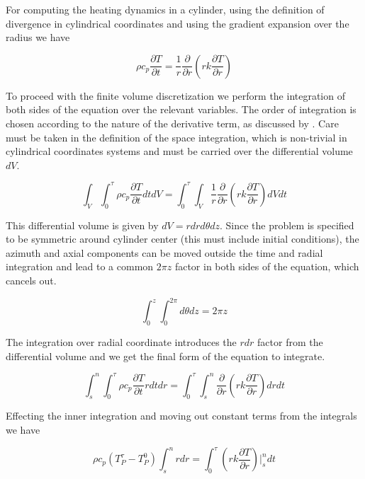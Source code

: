 \documentclass[oneside]{textbook}
\begin{document}
For computing the heating dynamics in a cylinder, using the definition of divergence in cylindrical coordinates and using the gradient expansion over the radius we have

\begin{equation}
\rho{}c_{p}\frac{\partial{}T}{\partial{}t}=
\frac{1}{r}\frac{\partial}{\partial{}r}
\left(rk\frac{\partial{}T}{\partial{}r}\right)
\end{equation}

To proceed with the finite volume discretization we perform the integration of both sides of the equation over the relevant variables. The order of integration is chosen according to the nature of the derivative term, as discussed by \textcite{Patankar1980}. Care must be taken in the definition of the space integration, which is non-trivial in cylindrical coordinates systems and must be carried over the differential volume $dV$.

\begin{equation}
\int_{V}\int_{0}^{\tau}
\rho{}c_{p}\frac{\partial{}T}{\partial{}t}dtdV=
\int_{0}^{\tau}\int_{V}
\frac{1}{r}\frac{\partial}{\partial{}r}
\left(rk\frac{\partial{}T}{\partial{}r}\right)dVdt
\end{equation}

This differential volume is given by $dV=rdr{}d\theta{}dz$. Since the problem is specified to be symmetric around cylinder center (this must include initial conditions), the azimuth and axial components can be moved outside the time and radial integration and lead to a common $2\pi{}z$ factor in both sides of the equation, which cancels out.

\begin{equation}
\int_{0}^{z}\int_{0}^{2\pi}d\theta{}dz=2\pi{}z
\end{equation}

The integration over radial coordinate introduces the $rdr$ factor from the differential volume and we get the final form of the equation to integrate.

\begin{equation}
\int_{s}^{n}\int_{0}^{\tau}
\rho{}c_{p}\frac{\partial{}T}{\partial{}t}rdtdr=
\int_{0}^{\tau}\int_{s}^{n}
\frac{\partial}{\partial{}r}
\left(rk\frac{\partial{}T}{\partial{}r}\right)drdt
\end{equation}

Effecting the inner integration and moving out constant terms from the integrals we have

\begin{equation}
\rho{}c_{p}\left(T_P^{\tau}-T_P^{0}\right)\int_{s}^{n}rdr=
\int_{0}^{\tau}
\left(rk\frac{\partial{}T}{\partial{}r}\right)\bigg\vert_{s}^{n}dt
\end{equation}
\end{document}
